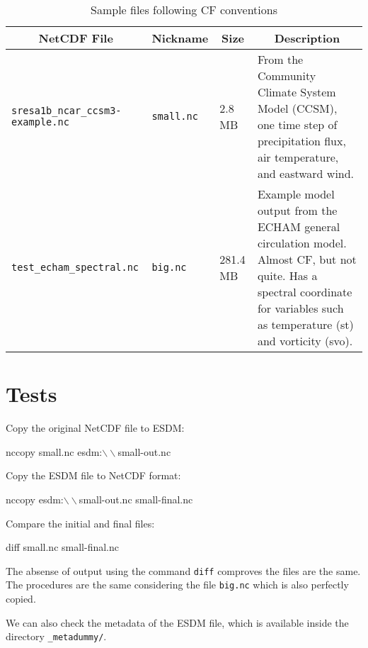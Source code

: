 \begin{table}[H]
\centering
\begin{tabular}{|l|l|l|m{4.2cm}|}
\hline
\multicolumn{1}{|c|}{NetCDF File}	& \multicolumn{1}{c|}{Nickname} & \multicolumn{1}{c|}{Size} & \multicolumn{1}{c|}{Description} \\ \hline \hline
\texttt{sresa1b\_ncar\_ccsm3-example.nc} & \texttt{small.nc} & 2.8 MB & From the Community Climate System Model (CCSM), one time step of precipitation flux, air temperature, and eastward wind. \\ \hline
\texttt{test\_echam\_spectral.nc} & \texttt{big.nc} & 281.4 MB & Example model output from the ECHAM general circulation model. Almost CF, but not quite. Has a spectral coordinate for variables such as temperature (st) and vorticity (svo). \\ \hline
\hline
\end{tabular}
\caption{\label{tab:netcdf} Sample files following CF conventions}
\end{table}

\section{Tests}

Copy the original NetCDF file to ESDM:

\begin{framed}
nccopy small.nc esdm:$\backslash\backslash$small-out.nc
\end{framed}

Copy the ESDM file to NetCDF format:

\begin{framed}
nccopy esdm:$\backslash\backslash$small-out.nc small-final.nc
\end{framed}

Compare the initial and final files:

\begin{framed}
diff small.nc small-final.nc
\end{framed}

The absense of output using the command \texttt{diff} comproves the files are the same.
The procedures are the same considering the file \texttt{big.nc} which is also perfectly copied.

We can also check the metadata of the ESDM file, which is available inside the directory \texttt{\_metadummy/}.

